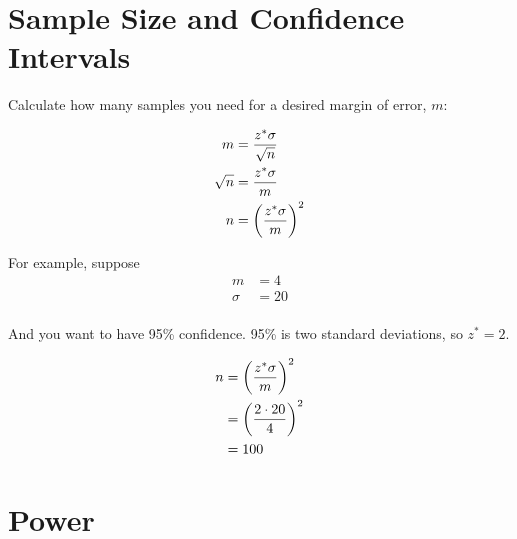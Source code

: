 \documentclass[letterpaper, landscape]{exam}
\begin{document}



  \section{Sample Size and Confidence Intervals}

  Calculate how many samples you need for a desired margin of error, $m$:

  \begin{align*}
    m        & = \frac{z^* \sigma}{\sqrt{n}} \\
    \sqrt{n} & = \frac{z^* \sigma}{m} \\
    n        & = \del{ \frac{z^* \sigma}{m} }^2 \\
  \end{align*}

  For example, suppose 
  \begin{align*}
    m      & = 4 \\
    \sigma & = 20 \\
  \end{align*}
  
  And you want to have 95\% confidence. 95\% is two standard deviations, so
  $z^* = 2$. 

  \begin{align*}
    n & = \del{ \frac{z^* \sigma}{m} }^2 \\
      & = \del{ \frac{2 \cdot 20}{4} }^2 \\
      & = 100 \\
  \end{align*}

  \section{Power}
\end{document}
